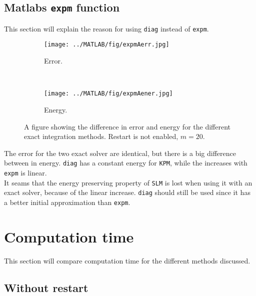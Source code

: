 \subsection{Matlabs \texttt{expm} function} \label{sec:resultexpm} %
This section will explain the reason for using \texttt{diag} instead of \texttt{expm}. %
\begin{figure}[H]
        \centering
		\begin{subfigure}[b]{0.45\textwidth}
                \texttt{[image: ../MATLAB/fig/expmAerr.jpg]}
                \caption{ Error. }
                \label{fig:expmSerr}
        \end{subfigure}%
        ~
        \begin{subfigure}[b]{0.45\textwidth}
                \texttt{[image: ../MATLAB/fig/expmAener.jpg]}
                \caption{ Energy. }
                \label{fig:expmSener}
        \end{subfigure}
        \caption{A figure showing the difference in error and energy for the different exact integration methods. Restart is not enabled, $m = 20$. }
        \label{fig:expm}
\end{figure}
\noindent The error for the two exact solver are identical, but there is a big difference between in energy. \texttt{diag} has a constant energy for \texttt{KPM}, while the increases with \texttt{expm} is linear.\\
It seams that the energy preserving property of \texttt{SLM} is lost when using it with an exact solver, because of the linear increase. \texttt{diag} should still be used since it has a better initial approximation than \texttt{expm}. \\
\section{Computation time}%
\label{sec:cruntime}
This section will compare computation time for the different methods discussed. 

\subsection{Without restart}

